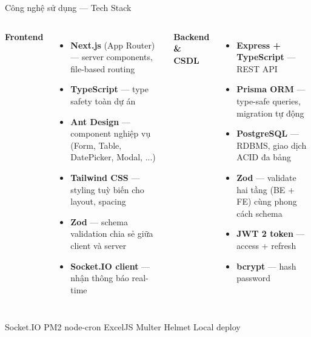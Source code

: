 \documentclass[aspectratio=43,xcolor=table]{beamer}
\newcommand{\hustpill}[1]{\colorbox{hustlight}{\textcolor{hustred}{\small #1}}}
\begin{document}
\begin{frame}{Công nghệ sử dụng --- Tech Stack}
  \begin{columns}[T,onlytextwidth]
    \textcolor{hustred}{\textbf{Frontend}}
    \begin{itemize}\small
      \item \textbf{Next.js} (App Router) --- server components, file-based routing
      \item \textbf{TypeScript} --- type safety toàn dự án
      \item \textbf{Ant Design} --- component nghiệp vụ (Form, Table, DatePicker, Modal, ...)
      \item \textbf{Tailwind CSS} --- styling tuỳ biến cho layout, spacing
      \item \textbf{Zod} --- schema validation chia sẻ giữa client và server
      \item \textbf{Socket.IO client} --- nhận thông báo real-time
    \end{itemize}

    \textcolor{hustred}{\textbf{Backend \& CSDL}}
    \begin{itemize}\small
      \item \textbf{Express + TypeScript} --- REST API
      \item \textbf{Prisma ORM} --- type-safe queries, migration tự động
      \item \textbf{PostgreSQL} --- RDBMS, giao dịch ACID đa bảng
      \item \textbf{Zod} --- validate hai tầng (BE + FE) cùng phong cách schema
      \item \textbf{JWT 2 token} --- access + refresh
      \item \textbf{bcrypt} --- hash password
    \end{itemize}
  \end{columns}

  \vspace{0.3cm}
  \centering
  \hustpill{Socket.IO} \hustpill{PM2} \hustpill{node-cron} \hustpill{ExcelJS} \hustpill{Multer} \hustpill{Helmet} \hustpill{Local deploy}
\end{frame}
\end{document}
